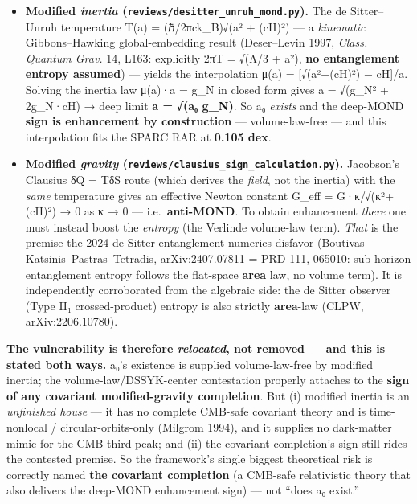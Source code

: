 \documentclass[
]{article}
\providecommand{\tightlist}{%
  \setlength{\itemsep}{0pt}\setlength{\parskip}{0pt}}
\begin{document}
\begin{itemize}
\tightlist
\item
  \textbf{Modified \emph{inertia}
  (\texttt{reviews/desitter\_unruh\_mond.py}).} The de Sitter--Unruh
  temperature T(a) = (ℏ/2πck\_B)√(a² + (cH)²) --- a \emph{kinematic}
  Gibbons--Hawking global-embedding result (Deser--Levin 1997,
  \emph{Class. Quantum Grav.} 14, L163: explicitly 2πT = √(Λ/3 + a²),
  \textbf{no entanglement entropy assumed}) --- yields the interpolation
  μ(a) = {[}√(a²+(cH)²) − cH{]}/a. Solving the inertia law μ(a)·a = g\_N
  in closed form gives a = √(g\_N² + 2g\_N·cH) → deep limit \textbf{a =
  √(a₀ g\_N)}. So a₀ \emph{exists} and the deep-MOND \textbf{sign is
  enhancement by construction} --- volume-law-free --- and this
  interpolation fits the SPARC RAR at \textbf{0.105 dex}.
\item
  \textbf{Modified \emph{gravity}
  (\texttt{reviews/clausius\_sign\_calculation.py}).} Jacobson's
  Clausius δQ = TδS route (which derives the \emph{field}, not the
  inertia) with the \emph{same} temperature gives an effective Newton
  constant G\_eff = G·κ/√(κ²+(cH)²) → 0 as κ → 0 ---
  i.e.~\textbf{anti-MOND}. To obtain enhancement \emph{there} one must
  instead boost the \emph{entropy} (the Verlinde volume-law term).
  \emph{That} is the premise the 2024 de Sitter-entanglement numerics
  disfavor (Boutivas--Katsinis--Pastras--Tetradis, arXiv:2407.07811 =
  PRD 111, 065010: sub-horizon entanglement entropy follows the
  flat-space \textbf{area} law, no volume term). It is independently
  corroborated from the algebraic side: the de Sitter observer (Type II₁
  crossed-product) entropy is also strictly \textbf{area}-law (CLPW,
  arXiv:2206.10780).
\end{itemize}

\textbf{The vulnerability is therefore \emph{relocated}, not removed ---
and this is stated both ways.} a₀'s existence is supplied
volume-law-free by modified inertia; the volume-law/DSSYK-center
contestation properly attaches to the \textbf{sign of any covariant
modified-gravity completion}. But (i) modified inertia is an
\emph{unfinished house} --- it has no complete CMB-safe covariant theory
and is time-nonlocal / circular-orbits-only (Milgrom 1994), and it
supplies no dark-matter mimic for the CMB third peak; and (ii) the
covariant completion's sign still rides the contested premise. So the
framework's single biggest theoretical risk is correctly named
\textbf{the covariant completion} (a CMB-safe relativistic theory that
also delivers the deep-MOND enhancement sign) --- not ``does a₀ exist.''
\end{document}
